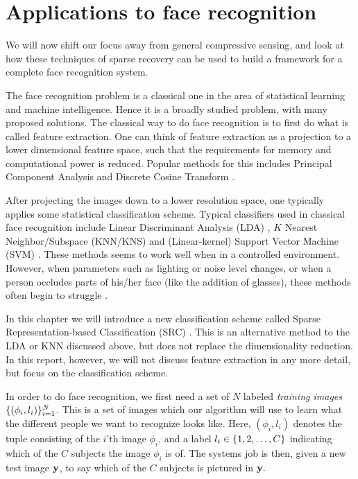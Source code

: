 \chapter{Applications to face recognition}
We will now shift our focus away from general compressive sensing, and look at how these techniques of sparse recovery can be used to build a framework for a complete face recognition system. 

The face recognition problem is a classical one in the area of statistical learning and machine intelligence. Hence it is a broadly studied problem, with many proposed solutions. The classical way to do face recognition is to first do what is called feature extraction. One can think of feature extraction as a projection to a lower dimensional feature space, such that the requirements for memory and computational power is reduced. Popular methods for this includes Principal Component Analysis and Discrete Cosine Transform \cite{bhat2014performance}.

After projecting the images down to a lower resolution space, one typically applies some statistical classification scheme. Typical classifiers used in classical face recognition include  Linear Discriminant Analysis (LDA) \cite{bhat2014performance}, $ K $ Nearest Neighbor/Subspace (KNN/KNS) \cite{lee2005acquiring} and (Linear-kernel) Support Vector Machine (SVM) \cite{wright09facerecog}. These methods seems to work well when in a controlled environment. However, when parameters such as lighting or noise level changes, or when a person occludes parts of his/her face (like the addition of glasses), these methods often begin to struggle \cite{eldar12theoryapplic}.

In this chapter we will introduce a new classification scheme called Sparse Representation-based Classification (SRC) \cite{wright09facerecog}. This is an alternative method to the LDA or KNN discussed above, but does not replace the dimensionality reduction. In this report, however, we will not discuss feature extraction in any more detail, but focus on the classification scheme. 

In order to do face recognition, we first need a set of $ N $ labeled \textit{training images} $ \{(\phi_{i}, l_{i})\}_{i=1}^{N} $. This is a set of images which our algorithm will use to learn what the different people we want to recognize looks like. Here, $ (\phi_{i}, l_{i}) $ denotes the tuple consisting of the $ i $'th image $ \phi_{i} $, and a label $ l_{i} \in \{1, 2, \ldots, C\} $ indicating which of the $ C $ subjects the image $ \phi_{i} $ is of. The systems job is then, given a new test image $ \mathbf{y} $, to say which of the $ C $ subjects is pictured in $ \mathbf{y}. $




